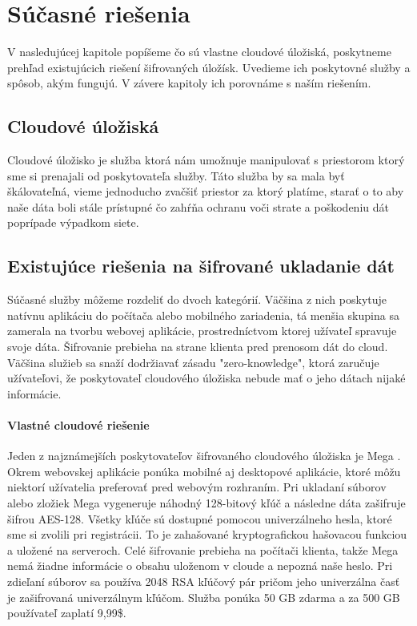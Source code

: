 \chapter{Súčasné riešenia}

V nasledujúcej kapitole popíšeme čo sú vlastne cloudové úložiská, poskytneme prehľad existujúcich riešení šifrovaných úložísk. Uvedieme ich poskytovné služby a spôsob, akým fungujú. V závere kapitoly ich porovnáme s naším riešením.

\section{Cloudové úložiská}
	Cloudové úložisko je služba ktorá nám umožnuje manipulovať s priestorom ktorý sme si prenajali od poskytovateľa služby. Táto služba by sa mala byť škálovateľná, vieme jednoducho zvačšiť priestor za ktorý platíme, starať o to aby naše dáta boli stále prístupné čo zahŕňa ochranu voči strate a poškodeniu dát poprípade výpadkom siete. 
	
\section{Existujúce riešenia na šifrované ukladanie dát}
	Súčasné služby môžeme rozdeliť do dvoch kategórií. Väčšina z nich poskytuje natívnu aplikáciu do počítača alebo mobilného zariadenia, tá menšia skupina sa zamerala na tvorbu webovej aplikácie, prostredníctvom ktorej užívateľ spravuje svoje dáta. Šifrovanie prebieha na strane klienta pred prenosom dát do cloud. Väčšina služieb sa snaží dodržiavať zásadu "zero-knowledge", ktorá zaručuje užívateľovi, že poskytovateľ cloudového úložiska nebude mať o jeho dátach nijaké informácie. 
	
	\subsubsection{Vlastné cloudové riešenie}
		Jeden z najznámejších poskytovateľov šifrovaného cloudového úložiska je Mega \cite{mega}. Okrem webovskej aplikácie ponúka mobilné aj desktopové aplikácie, ktoré môžu niektorí užívatelia preferovať pred webovým rozhraním. Pri ukladaní súborov alebo zložiek Mega vygeneruje náhodný 128-bitový kľúč a následne dáta zašifruje šifrou AES-128. Všetky kľúče sú dostupné pomocou univerzálneho hesla, ktoré sme si zvolili pri registrácii. To je zahašované kryptografickou hašovacou funkciou a uložené na serveroch. Celé šifrovanie prebieha na počítači klienta, takže Mega nemá žiadne informácie o obsahu uloženom v cloude a nepozná naše heslo. Pri zdieľaní súborov sa používa 2048 RSA kľúčový pár pričom jeho univerzálna časť je zašifrovaná univerzálnym kľúčom. Služba ponúka 50 GB zdarma a za 500 GB používateľ zaplatí 9,99\$.
		
